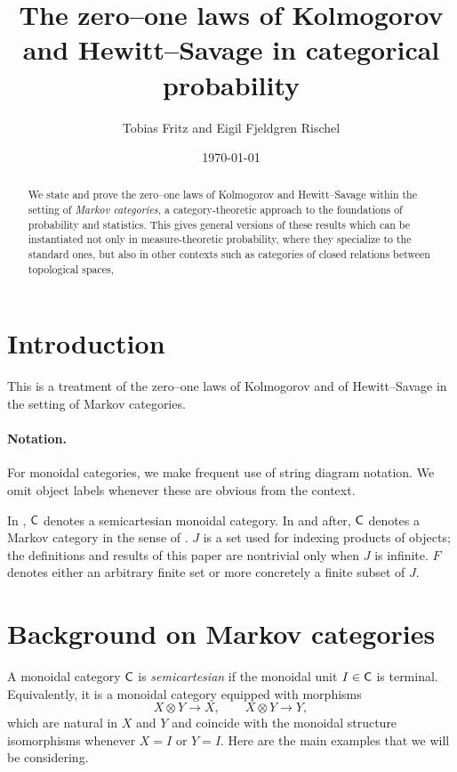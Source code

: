 \documentclass[11pt]{article}
\author{Tobias Fritz and Eigil Fjeldgren Rischel}
\title{The zero--one laws of Kolmogorov and Hewitt--Savage in categorical probability}
\date{\today}
\begin{document}
\maketitle

\begin{abstract}
	We state and prove the zero--one laws of Kolmogorov and Hewitt--Savage within the setting of \emph{Markov categories}, a category-theoretic approach to the foundations of probability and statistics. This gives general versions of these results which can be instantiated not only in measure-theoretic probability, where they specialize to the standard ones, but also in other contexts such as categories of closed relations between topological spaces, 
\end{abstract}

\tableofcontents

\section{Introduction}

This is a treatment of the zero--one laws of Kolmogorov and of Hewitt--Savage in the setting of Markov categories.

\paragraph*{Notation.} 

For monoidal categories, we make frequent use of string diagram notation. We omit object labels whenever these are obvious from the context.

In , $\mathsf{C}$ denotes a semicartesian monoidal category. In  and after, $\mathsf{C}$ denotes a Markov category in the sense of . $J$ is a set used for indexing products of objects; the definitions and results of this paper are nontrivial only when $J$ is infinite. $F$ denotes either an arbitrary finite set or more concretely a finite subset of $J$.

\section{Background on Markov categories}

A monoidal category $\mathsf{C}$ is \emph{semicartesian} if the monoidal unit $I \in \mathsf{C}$ is terminal. Equivalently, it is a monoidal category equipped with morphisms
\[
	X \otimes Y \longrightarrow X, \qquad X \otimes Y \longrightarrow Y,
\]
which are natural in $X$ and $Y$ and coincide with the monoidal structure isomorphisms whenever $X = I$ or $Y = I$. Here are the main examples that we will be considering.
\end{document}
